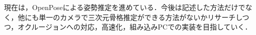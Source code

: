 \documentclass[titlepage]{jarticle}
\begin{document}
%
%
%
%


%

%
%
%
%
現在は，OpenPoseによる姿勢推定を進めている．今後は記述した方法だけでなく，他にも単一のカメラで三次元骨格推定ができる方法がないかリサーチしつつ，オクルージョンへの対応，高速化，組み込みPCでの実装を目指していく．
%
%
%

%

%
%
%
%

%
%
\end{document}
